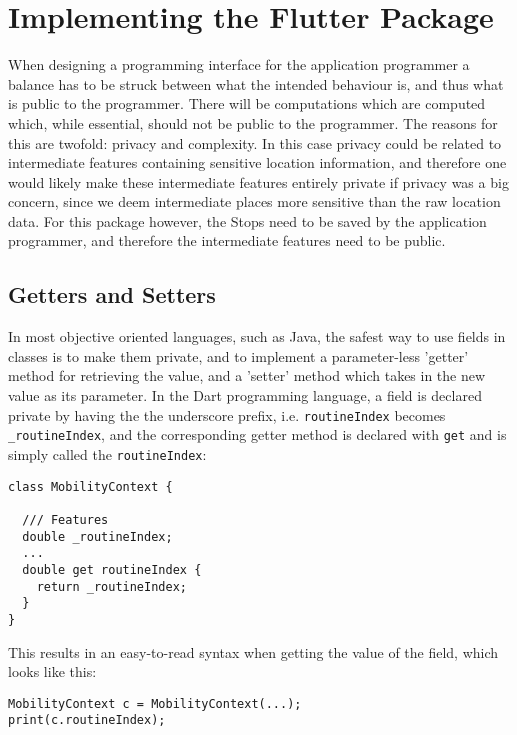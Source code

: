\section{Implementing the Flutter Package}
When designing a programming interface for the application programmer a balance has to be struck between what the intended behaviour is, and thus what is public to the programmer. There will be computations which are computed which, while essential, should not be public to the programmer. The reasons for this are twofold: privacy and complexity. In this case privacy could be related to intermediate features containing sensitive location information, and therefore one would likely make these intermediate features entirely private if privacy was a big concern, since we deem intermediate places more sensitive than the raw location data. For this package however, the Stops need to be saved by the application programmer, and therefore the intermediate features need to be public. 

\subsection{Getters and Setters}
In most objective oriented languages, such as Java, the safest way to use fields in classes is to make them private, and to implement a parameter-less 'getter' method for retrieving the value, and a 'setter' method which takes in the new value as its parameter. In the Dart programming language, a field is declared private by having the the underscore prefix, i.e. \verb|routineIndex| becomes \verb|_routineIndex|, and the corresponding getter method is declared with \verb|get| and is simply called the \verb|routineIndex|:

\begin{verbatim}
class MobilityContext {

  /// Features
  double _routineIndex;
  ...
  double get routineIndex {
    return _routineIndex;
  }
}
\end{verbatim}

This results in an easy-to-read syntax when getting the value of the field, which looks like this:

\begin{verbatim}
MobilityContext c = MobilityContext(...);
print(c.routineIndex);
\end{verbatim}

